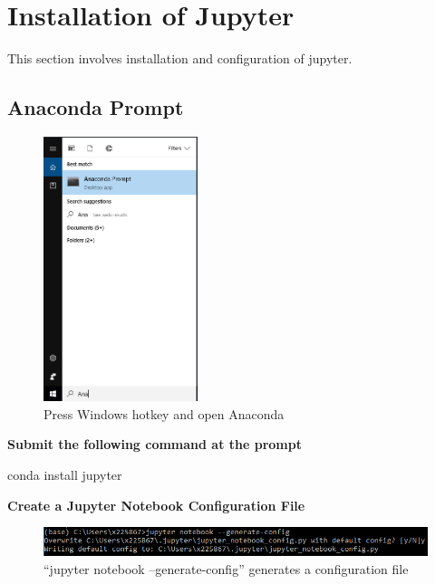 \documentclass{report}
\begin{document}
    
\chapter*{Installation of Jupyter}
\bigskip
This section involves installation and configuration of jupyter. 

\section*{Anaconda Prompt}
\begin{figure}[H]
\centering
\includegraphics[width=0.4\textwidth]{./images/Prompt.PNG}
\caption{Press Windows hotkey and open Anaconda}
\end{figure}

\begin{Large}\begin{center}\textbf{Submit the following command at the prompt}\end{center}\end{Large}
\begin{center}
conda install jupyter
\end{center}

\begin{Large}\begin{center}\textbf{Create a Jupyter Notebook Configuration File}\end{center}\end{Large}

\begin{figure}[H]
\centering
\includegraphics{./images/generate_configuration_file.PNG}
\caption{``jupyter notebook --generate-config'' generates a configuration file}
\end{figure}
\end{document}
